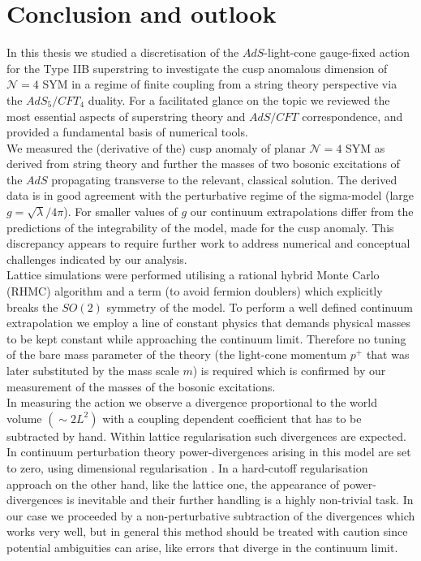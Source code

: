 \chapter{Conclusion and outlook}
In this thesis we studied a discretisation of the $AdS$-light-cone gauge-fixed action for the Type IIB  superstring to investigate the cusp anomalous dimension of $\mathcal{N}=4$ SYM in a regime of finite  coupling from a string theory perspective via the $AdS_{5}/CFT_{4}$ duality. For a facilitated glance on the topic we reviewed the most essential aspects of superstring theory and $AdS/CFT$ correspondence, and provided a fundamental basis of numerical tools.\\
We measured the (derivative of the) cusp anomaly of planar $\mathcal{N}=4$ SYM as derived from string theory and further the masses of two bosonic excitations of the $AdS$  propagating transverse to the relevant, classical solution. The derived data is in good agreement with the perturbative regime of the sigma-model (large $g=\sqrt{\lambda}/4\pi$). For smaller values of $g$ our continuum extrapolations differ from the predictions of the integrability of the model, made for the cusp anomaly. This discrepancy appears to require further work to address numerical and conceptual challenges indicated by our analysis.\\
Lattice simulations were performed utilising a rational hybrid Monte Carlo \linebreak(RHMC) algorithm and a  term (to avoid fermion doublers) which explicitly breaks the $SO(2)$ symmetry of the model. To perform a well defined continuum extrapolation we employ a line of constant physics that demands physical masses to be kept constant while approaching the continuum limit. Therefore no tuning of the bare mass parameter of the theory (the light-cone momentum $p^{+}$ that was later substituted by the mass scale $m$) is required which is confirmed by our measurement of the masses of the bosonic excitations.\\
In measuring the action we observe a divergence proportional to the world volume $(\sim 2L^{2})$ with a coupling dependent coefficient that has to be subtracted by hand. Within lattice regularisation such divergences are expected. In continuum perturbation theory power-divergences arising in this model are set to zero, using dimensional regularisation \cite{Giombi:2009gd}. In a hard-cutoff regularisation approach on the other hand, like the lattice one, the appearance of power-divergences is inevitable and their further handling is a highly non-trivial task. In our case we proceeded by a non-perturbative subtraction of the divergences which works very well, but in general this method should be treated with caution since potential ambiguities can arise, like errors that diverge in the continuum limit.\\

